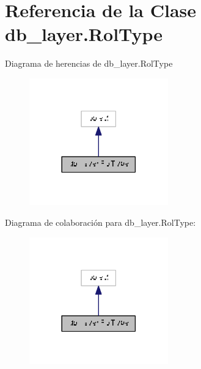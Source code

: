 \hypertarget{classdb__layer_1_1_rol_type}{\section{Referencia de la Clase db\-\_\-layer.\-Rol\-Type}
\label{classdb__layer_1_1_rol_type}
}


Diagrama de herencias de db\-\_\-layer.\-Rol\-Type\nopagebreak
\begin{figure}[H]
\begin{center}
\leavevmode
\includegraphics[width=170pt]{classdb__layer_1_1_rol_type__inherit__graph}
\end{center}
\end{figure}


Diagrama de colaboración para db\-\_\-layer.\-Rol\-Type\-:\nopagebreak
\begin{figure}[H]
\begin{center}
\leavevmode
\includegraphics[width=170pt]{classdb__layer_1_1_rol_type__coll__graph}
\end{center}
\end{figure}
